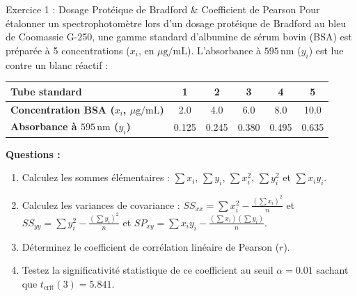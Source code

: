 \documentclass[11pt,a4paper]{article}
\begin{document}

\begin{exercicebox}{Exercice 1 : Dosage Protéique de Bradford \& Coefficient de Pearson}
Pour étalonner un spectrophotomètre lors d'un dosage protéique de Bradford au bleu de Coomassie G-250, une gamme standard d'albumine de sérum bovin (BSA) est préparée à 5 concentrations ($x_i$, en $\mu\text{g/mL}$). L'absorbance à $595\,\text{nm}$ ($y_i$) est lue contre un blanc réactif :
\begin{center}
  \small
  \begin{tabular}{lccccc}
    \toprule
    \textbf{Tube standard} & \textbf{1} & \textbf{2} & \textbf{3} & \textbf{4} & \textbf{5} \\
    \midrule
    \textbf{Concentration BSA ($x_i$, $\mu\text{g/mL}$)} & 2.0 & 4.0 & 6.0 & 8.0 & 10.0 \\
    \textbf{Absorbance à $595\,\text{nm}$ ($y_i$)}      & 0.125 & 0.245 & 0.380 & 0.495 & 0.635 \\
    \bottomrule
  \end{tabular}
\end{center}

\textbf{Questions :}
\begin{enumerate}[label=\textbf{\alph*.}]
  \item Calculez les sommes élémentaires : $\sum x_i$, $\sum y_i$, $\sum x_i^2$, $\sum y_i^2$ et $\sum x_i y_i$.
  \item Calculez les variances de covariance : $SS_{xx} = \sum x_i^2 - \frac{(\sum x_i)^2}{n}$ et $SS_{yy} = \sum y_i^2 - \frac{(\sum y_i)^2}{n}$ et $SP_{xy} = \sum x_i y_i - \frac{(\sum x_i)(\sum y_i)}{n}$.
  \item Déterminez le coefficient de corrélation linéaire de Pearson ($r$).
  \item Testez la significativité statistique de ce coefficient au seuil $\alpha = 0.01$ sachant que $t_{\text{crit}}(3) = 5.841$.
\end{enumerate}
\end{exercicebox}
\end{document}
